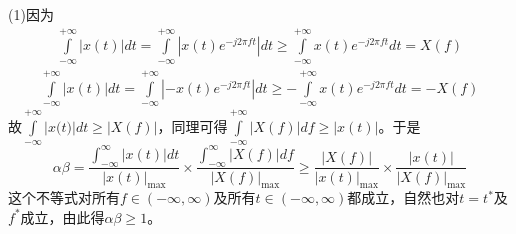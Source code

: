 \documentclass[utf8]{article}
\begin{document}
(1)因为
$$\begin{array}{l}\int\limits_{-\infty}^{+\infty}\left|x\left(t\right)\right| dt=\int\limits_{-\infty}^{+\infty}\left|x\left(t\right)e^{-j2\pi ft}\right|dt \geq\int\limits_{-\infty}^{+\infty}x\left(t\right)e^{-j2\pi ft}dt=X\left(f \right)\end{array}$$
$$\begin{array}{l}\int \limits_{-\infty}^{+ \infty} \left| x \left( t \right) \right| dt= \int \limits_{-\infty}^{+ \infty} \left|-x \left( t \right) e^{-j2 \pi ft} \right| dt \geq- \int \limits_{- \infty}^{+ \infty}x \left( t \right) e^{-j2 \pi ft}dt=-X \left( f \right) \end{array}$$
故$\int \limits_{-\infty}^{+ \infty} \big|x \big( t \big) \big| dt \geq \left| X \left( f \right) \right|$，同理可得$\int \limits_{-\infty}^{+ \infty} \left| X \left( f \right) \right| df \geq \left| x \left( t \right) \right|$。于是 
$$\alpha \beta= \frac{ \int_{- \infty}^{ \infty} \left| x \left( t \right) \right| dt}{ \left| x \left( t \right) \right|_{ \max}} \times \frac{ \int_{- \infty}^{ \infty} \left| X \left( f \right) \right| df}{ \left| X \left( f \right) \right|_{ \max}} \geq \frac{ \left| X \left( f \right) \right|}{ \left| x \left( t \right) \right|_{ \max}} \times \frac{ \left| x \left( t \right) \right|}{ \left| X \left( f \right) \right|_{ \max}}$$
这个不等式对所有$f \in(- \infty, \infty)$及所有$t \in(- \infty, \infty)$都成立，自然也对$t=t^{*}$及$f^{*}$成立，由此得$\alpha \beta \geq 1$。 
\end{document}
